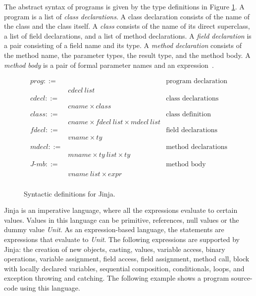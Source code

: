 \documentclass[tese,capa,english]{texufpel}
\begin{document}
The abstract syntax of programs is given by the type definitions in Figure \ref{fig:jinja-syntax}. A program is a list of \emph{class declarations}. A class declaration consists of the name of the class and the class itself. A \emph{class} consists of the name of its direct superclass, a list of field declarations, and a list of method declarations. A \emph{field declaration} is a pair consisting of a field name and its type. A \emph{method declaration} consists of the method name, the parameter types, the result type, and the method body. A \emph{method body} is a pair of formal parameter names and an expression~\cite{Klein:2006:MMJ:1146809.1146811}.

\begin{figure}[!htb]
\[
\begin{array}{llr}
  prog ::= & \ \ \ \ \ \ \ \ \ \ \ \ \ \ \ \ \ \ \ \ \ \ \ \ \ \ \ \ \ \ \ \ \ \ \ \ \ \ & \textrm{program declaration} \\
        & cdecl \ list & \\
  cdecl ::= & & \textrm{class declarations} \\
        & cname \times class & \\
  class ::= & & \textrm{class definition} \\
        & cname \times fdecl \ list \times mdecl \ list & \\
  fdecl ::= & & \textrm{field declarations} \\
        & vname \times ty & \\  
  mdecl ::= & & \textrm{method declarations} \\
        & mname \times ty \ list \times ty & \\
  J\textrm{-}mb ::= & & \textrm{method body} \\
        & vname \ list \times expr & \\
\end{array}
\]
\caption{Syntactic definitions for Jinja.}
\label{fig:jinja-syntax}
\end{figure}

Jinja is an imperative language, where all the expressions evaluate to certain values. Values in this language can be primitive, references, null values or the dummy value \emph{Unit}. As an expression-based language, the statements are expressions that evaluate to \emph{Unit}. The following expressions are supported by Jinja: the creation of new objects, casting, values, variable access, binary operations, variable assignment, field access, field assignment, method call, block with locally declared variables, sequential composition, conditionals, loops, and exception throwing and catching. The following example shows a program source-code using this language.
\end{document}
